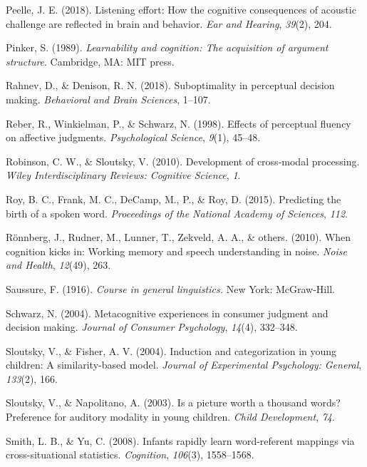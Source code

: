 \documentclass[english,,man,floatsintext]{apa6}
\theoremstyle{definition}
\theoremstyle{definition}
\theoremstyle{definition}
\theoremstyle{remark}
\begin{document}
\hypertarget{ref-peelle2018}{}
Peelle, J. E. (2018). Listening effort: How the cognitive consequences
of acoustic challenge are reflected in brain and behavior. \emph{Ear and
Hearing}, \emph{39}(2), 204.

\hypertarget{ref-pinker1989}{}
Pinker, S. (1989). \emph{Learnability and cognition: The acquisition of
argument structure}. Cambridge, MA: MIT press.

\hypertarget{ref-rahnev2018}{}
Rahnev, D., \& Denison, R. N. (2018). Suboptimality in perceptual
decision making. \emph{Behavioral and Brain Sciences}, 1--107.

\hypertarget{ref-reber98}{}
Reber, R., Winkielman, P., \& Schwarz, N. (1998). Effects of perceptual
fluency on affective judgments. \emph{Psychological Science},
\emph{9}(1), 45--48.

\hypertarget{ref-robinson2010}{}
Robinson, C. W., \& Sloutsky, V. (2010). Development of cross-modal
processing. \emph{Wiley Interdisciplinary Reviews: Cognitive Science},
\emph{1}.

\hypertarget{ref-roy2015}{}
Roy, B. C., Frank, M. C., DeCamp, M., P., \& Roy, D. (2015). Predicting
the birth of a spoken word. \emph{Proceedings of the National Academy of
Sciences}, \emph{112}.

\hypertarget{ref-ronnberg2010}{}
Rönnberg, J., Rudner, M., Lunner, T., Zekveld, A. A., \& others. (2010).
When cognition kicks in: Working memory and speech understanding in
noise. \emph{Noise and Health}, \emph{12}(49), 263.

\hypertarget{ref-saussure1916}{}
Saussure, F. (1916). \emph{Course in general linguistics.} New York:
McGraw-Hill.

\hypertarget{ref-schwarz2004}{}
Schwarz, N. (2004). Metacognitive experiences in consumer judgment and
decision making. \emph{Journal of Consumer Psychology}, \emph{14}(4),
332--348.

\hypertarget{ref-sloutsky2004}{}
Sloutsky, V., \& Fisher, A. V. (2004). Induction and categorization in
young children: A similarity-based model. \emph{Journal of Experimental
Psychology: General}, \emph{133}(2), 166.

\hypertarget{ref-sloutsky2003}{}
Sloutsky, V., \& Napolitano, A. (2003). Is a picture worth a thousand
words? Preference for auditory modality in young children. \emph{Child
Development}, \emph{74}.

\hypertarget{ref-smith08}{}
Smith, L. B., \& Yu, C. (2008). Infants rapidly learn word-referent
mappings via cross-situational statistics. \emph{Cognition},
\emph{106}(3), 1558--1568.
\end{document}
